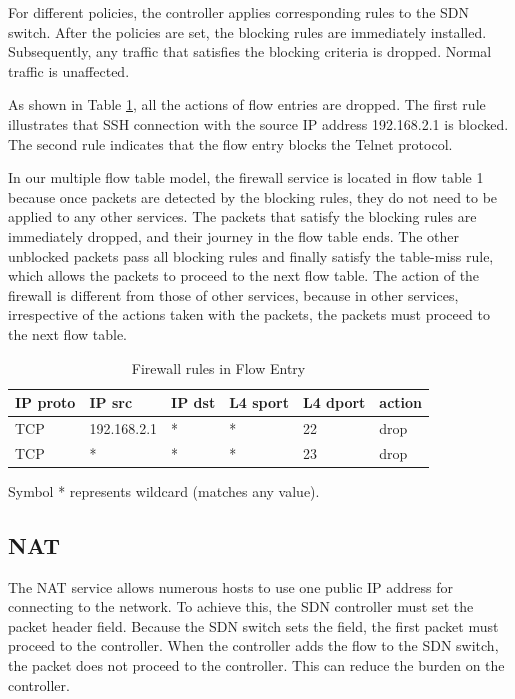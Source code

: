 \documentclass[10pt,journal]{IEEEtran}
\begin{document}
For different policies, the controller applies corresponding rules to the SDN switch. After the policies are set, the blocking rules are immediately installed. Subsequently, any traffic that satisfies the blocking criteria is dropped. Normal traffic is unaffected.

As shown in Table \ref{table:fw}, all the actions of flow entries are dropped. The first rule illustrates that SSH connection with the source IP address 192.168.2.1 is blocked. The second rule indicates that the flow entry blocks the Telnet protocol.

In our multiple flow table model, the firewall service is located in flow table 1 because once packets are detected by the blocking rules, they do not need to be applied to any other services. The packets that satisfy the blocking rules are immediately dropped, and their journey in the flow table ends. The other unblocked packets pass all blocking rules and finally satisfy the table-miss rule, which allows the packets to proceed to the next flow table. The action of the firewall is different from those of other services, because in other services, irrespective of the actions taken with the packets, the packets must proceed to the next flow table.

\begin{table}[!t]
\caption{Firewall rules in Flow Entry}
\label{table:fw}
\centering
\begin{threeparttable}
\begin{tabular}{|l|l|l|l|l|l|}
\hline
IP proto & IP src      & IP dst       & L4 sport & L4 dport & action \\ \hline
TCP      & 192.168.2.1 & *            & *        & 22       & drop   \\ \hline
TCP      & *           & *            & *        & 23       & drop   \\ \hline
\end{tabular}
  \begin{tablenotes}
    \item[] Symbol * represents wildcard (matches any value).
  \end{tablenotes}
\end{threeparttable}
\end{table}



\subsection{NAT}
The NAT service allows numerous hosts to use one public IP address for connecting to the network. To achieve this, the SDN controller must set the packet header field. Because the SDN switch sets the field, the first packet must proceed to the controller. When the controller adds the flow to the SDN switch, the packet does not proceed to the controller. This can reduce the burden on the controller.
\end{document}
